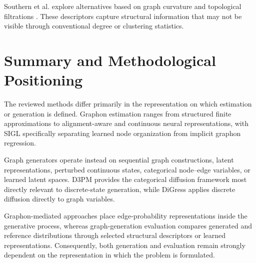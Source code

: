 Southern et al. explore alternatives based on graph curvature and topological filtrations \cite{southern2023curvature}. These descriptors capture structural information that may not be visible through conventional degree or clustering statistics.


\section{Summary and Methodological Positioning}
\label{sec:rw_summary}

The reviewed methods differ primarily in the representation on which estimation or generation is defined. Graphon estimation ranges from structured finite approximations to alignment-aware and continuous neural representations, with SIGL specifically separating learned node organization from implicit graphon regression.

Graph generators operate instead on sequential graph constructions, latent representations, perturbed continuous states, categorical node--edge variables, or learned latent spaces. D3PM provides the categorical diffusion framework most directly relevant to discrete-state generation, while DiGress applies discrete diffusion directly to graph variables.

Graphon-mediated approaches place edge-probability representations inside the generative process, whereas graph-generation evaluation compares generated and reference distributions through selected structural descriptors or learned representations. Consequently, both generation and evaluation remain strongly dependent on the representation in which the problem is formulated.
